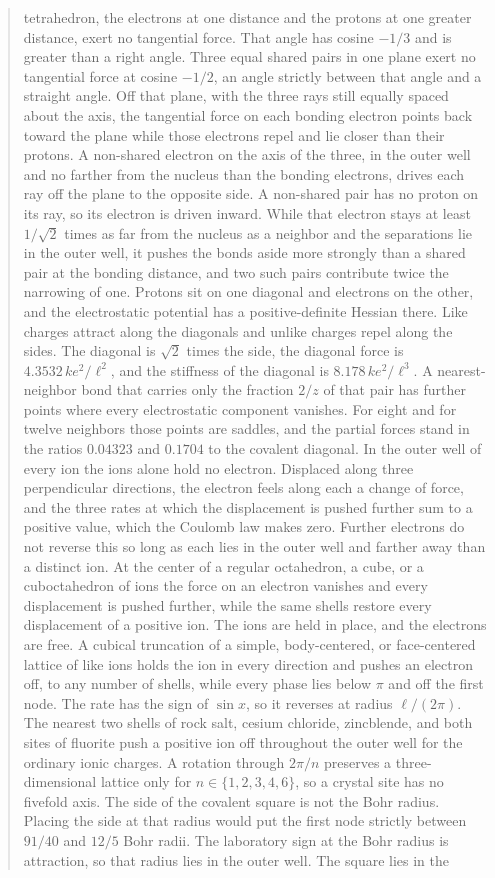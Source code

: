 \documentclass[a4paper]{article}
\begin{document}
\begin{abstract}
tetrahedron, the electrons at one distance and the protons at one greater distance, exert no tangential force. That angle has cosine \(-1/3\) and is greater than a right angle. Three equal shared pairs in one plane exert no tangential force at cosine \(-1/2\), an angle strictly between that angle and a straight angle. Off that plane, with the three rays still equally spaced about the axis, the tangential force on each bonding electron points back toward the plane while those electrons repel and lie closer than their protons. A non-shared electron on the axis of the three, in the outer well and no farther from the nucleus than the bonding electrons, drives each ray off the plane to the opposite side. A non-shared pair has no proton on its ray, so its electron is driven inward. While that electron stays at least \(1/\sqrt{2}\) times as far from the nucleus as a neighbor and the separations lie in the outer well, it pushes the bonds aside more strongly than a shared pair at the bonding distance, and two such pairs contribute twice the narrowing of one. Protons sit on one diagonal and electrons on the other, and the electrostatic potential has a positive-definite Hessian there. Like charges attract along the diagonals and unlike charges repel along the sides. The diagonal is \(\sqrt{2}\) times the side, the diagonal force is \(4.3532\,k e^{2}/\ell^{2}\), and the stiffness of the diagonal is \(8.178\,k e^{2}/\ell^{3}\). A nearest-neighbor bond that carries only the fraction \(2/z\) of that pair has further points where every electrostatic component vanishes. For eight and for twelve neighbors those points are saddles, and the partial forces stand in the ratios \(0.04323\) and \(0.1704\) to the covalent diagonal. In the outer well of every ion the ions alone hold no electron. Displaced along three perpendicular directions, the electron feels along each a change of force, and the three rates at which the displacement is pushed further sum to a positive value, which the Coulomb law makes zero. Further electrons do not reverse this so long as each lies in the outer well and farther away than a distinct ion. At the center of a regular octahedron, a cube, or a cuboctahedron of ions the force on an electron vanishes and every displacement is pushed further, while the same shells restore every displacement of a positive ion. The ions are held in place, and the electrons are free. A cubical truncation of a simple, body-centered, or face-centered lattice of like ions holds the ion in every direction and pushes an electron off, to any number of shells, while every phase lies below \(\pi\) and off the first node. The rate has the sign of \(\sin x\), so it reverses at radius \(\ell/(2\pi)\). The nearest two shells of rock salt, cesium chloride, zincblende, and both sites of fluorite push a positive ion off throughout the outer well for the ordinary ionic charges. A rotation through \(2\pi/n\) preserves a three-dimensional lattice only for \(n\in\{1,2,3,4,6\}\), so a crystal site has no fivefold axis. The side of the covalent square is not the Bohr radius. Placing the side at that radius would put the first node strictly between \(91/40\) and \(12/5\) Bohr radii. The laboratory sign at the Bohr radius is attraction, so that radius lies in the outer well. The square lies in the 
\end{abstract}
\end{document}
